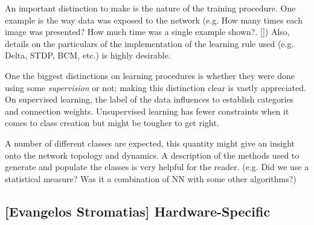 


An important distinction to make is the nature of the training procedure. One example is the way data was exposed to the network (e.g. How many times each image was presented? How much time was a single example shown?. [\cite{Diehl2015unsupervised}]) Also, details on the particulars of the implementation of the learning rule used (e.g. Delta, STDP, BCM, etc.) is highly desirable. 

One the biggest distinctions on learning procedures is whether they were done using some \emph{supervision} or not; making this distinction clear is vastly appreciated. On supervised learning, the label of the data influences to establish categories and connection weights. Unsupervised learning has fewer constraints when it comes to class creation but might be tougher to get right. 

A number of different classes are expected, this quantity might give an insight onto the network topology and dynamics. A description of the methods used to generate and populate the classes is very helpful for the reader. (e.g. Did we use a statistical measure? Was it a combination of NN with some other algorithms?)




\subsection{[Evangelos Stromatias] Hardware-Specific}


